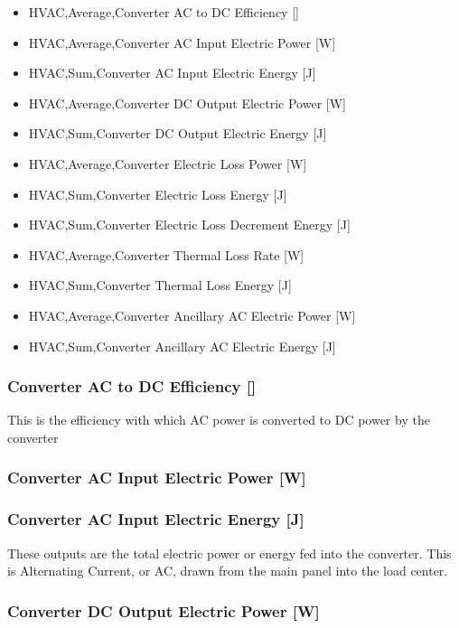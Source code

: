 \begin{itemize}
\tightlist
\item
  HVAC,Average,Converter AC to DC Efficiency {[]}
\item
  HVAC,Average,Converter AC Input Electric Power {[}W{]}
\item
  HVAC,Sum,Converter AC Input Electric Energy {[}J{]}
\item
  HVAC,Average,Converter DC Output Electric Power {[}W{]}
\item
  HVAC,Sum,Converter DC Output Electric Energy {[}J{]}
\item
  HVAC,Average,Converter Electric Loss Power {[}W{]}
\item
  HVAC,Sum,Converter Electric Loss Energy {[}J{]}
\item
  HVAC,Sum,Converter Electric Loss Decrement Energy {[}J{]}
\item
  HVAC,Average,Converter Thermal Loss Rate {[}W{]}
\item
  HVAC,Sum,Converter Thermal Loss Energy {[}J{]}
\item
  HVAC,Average,Converter Ancillary AC Electric Power {[}W{]}
\item
  HVAC,Sum,Converter Ancillary AC Electric Energy {[}J{]}
\end{itemize}

\subsubsection{Converter AC to DC Efficiency {[]}}\label{converter-ac-to-dc-efficiency}

This is the efficiency with which AC power is converted to DC power by the converter

\subsubsection{Converter AC Input Electric Power {[}W{]}}\label{converter-ac-input-electric-power-w}

\subsubsection{Converter AC Input Electric Energy {[}J{]}}\label{converter-ac-input-electric-energy-j}

These outputs are the total electric power or energy fed into the converter. This is Alternating Current, or AC, drawn from the main panel into the load center.

\subsubsection{Converter DC Output Electric Power {[}W{]}}\label{converter-dc-output-electric-power-w}

